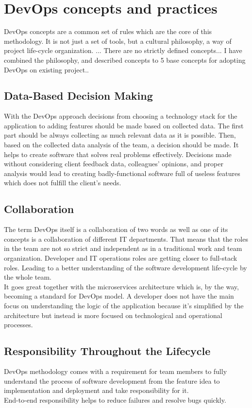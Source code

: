 \section{DevOps concepts and practices} DevOps concepts are a common set of rules which are the core of this methodology. It is not just a set of tools, but a cultural philosophy, a way of project life-cycle organization. ... There are no strictly defined concepts... I have combined the philosophy, and described concepts to 5 base concepts for adopting DevOps on existing project..

\subsection{Data-Based Decision Making} With the DevOps approach decisions from choosing a technology stack for the application to adding features should be made based on collected data. The first part should be always collecting as much relevant data as it is possible. Then, based on the collected data analysis of the team, a decision should be made. It helps to create software that solves real problems effectively. Decisions made without considering client feedback data, colleagues' opinions, and proper analysis would lead to creating badly-functional software full of useless features which does not fulfill the client's needs.

\subsection{Collaboration} The term DevOps itself is a collaboration of two words as well as one of its concepts is a collaboration of different IT departments. That means that the roles in the team are not so strict and independent as in a traditional work and team organization. Developer and IT operations roles are getting closer to full-stack roles. Leading to a better understanding of the software development life-cycle by the whole team.\\
It goes great together with the microservices architecture which is, by the way, becoming a standard for DevOps model. A developer does not have the main focus on understanding the logic of the application because it's simplified by the architecture but instead is more focused on technological and operational processes. 

\subsection{Responsibility Throughout the Lifecycle} DevOps methodology comes with a requirement for team members to fully understand the process of software development from the feature idea to implementation and deployment and take responsibility for it.\\
End-to-end responsibility helps to reduce failures and resolve bugs quickly.

